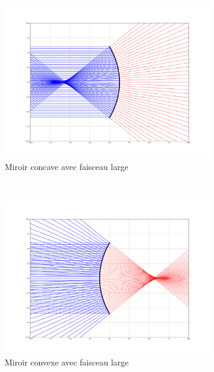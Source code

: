 \documentclass[a4paper,11pt]{article}
\begin{document}
\begin{figure}[H]
    \centering
    \begin{subfigure}[t]{0.45\linewidth}
    	\centering
		\includegraphics[width=\linewidth]{Figures/Figures_miroirs/conc_pastig.pdf}
		\caption{Miroir concave avec faisceau large}
		\label{fig:conc_pastig} 
    \end{subfigure}
    ~
    \begin{subfigure}[t]{0.45\linewidth}
    	\centering
		\includegraphics[width=\linewidth]{Figures/Figures_miroirs/conv_pastig.pdf}
		\caption{Miroir convexe avec faisceau large}
		\label{fig:conv_pastig} 
    \end{subfigure}
\hfill
    \begin{subfigure}[t]{0.45\linewidth}

\end{subfigure}
\end{figure}
\end{document}
